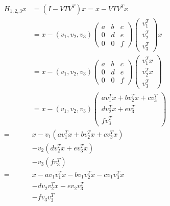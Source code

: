 \begin{align*}
  H_{1,2,3} x &= (I - V T V^T) x = x - V T V^T x\\
  &= x - (v_1, v_2, v_3)
  \begin{pmatrix}
    a & b & c\\ 
    0 & d & e\\
    0 & 0 & f
  \end{pmatrix}
  \begin{pmatrix}
    v_1^T \\ v_2^T \\ v_3^T
  \end{pmatrix}
  x\\
  &= x - (v_1, v_2, v_3)
  \begin{pmatrix}
    a & b & c\\ 
    0 & d & e\\
    0 & 0 & f
  \end{pmatrix}
  \begin{pmatrix}
    v_1^T x \\ v_2^T x \\ v_3^T
  \end{pmatrix}\\
  &= x - (v_1, v_2, v_3)
  \begin{pmatrix}
    a v_1^T x + b v_2^T x + c v_3^T\\ 
    d v_2^T x + e v_3^T \\
    f v_3^T
  \end{pmatrix}\\
  =& x - v_1(a v_1^T x + b v_2^T x + c v_3^T x) \\ 
   & - v_2 ( d v_2^T x + e v_3^T x) \\ 
   & - v_3 ( f v_3^T ) \\
  =& x - a v_1 v_1^T x - b v_1 v_2^T x - c v_1 v_3^T x \\
   & - d v_2 v_2^T x - e v_2 v_3^T \\
   & - f v_3 v_3^T
\end{align*}

